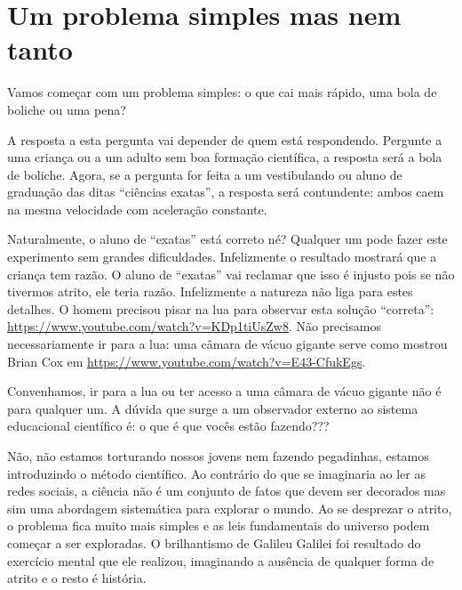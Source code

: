 \documentclass[article,12pt,oneside,a4paper,english,brazil,sumario=tradicional]{abntex2}
\date{2022}
\newcommand{\relatnum}{XYZ ABC-DEF}
\begin{document}

\imprimirfolhaderosto


\section{Um problema simples mas nem tanto}
\label{sec:intro}

Vamos começar com um problema simples: o que cai mais rápido, uma bola de boliche ou uma pena?

A resposta a esta pergunta vai depender de quem está respondendo. Pergunte a uma criança ou a um adulto sem boa formação científica, a resposta será a bola de boliche. Agora, se a pergunta for feita a um vestibulando ou aluno de graduação das ditas ``ciências exatas'', a resposta será contundente: ambos caem na mesma velocidade com aceleração constante.

Naturalmente, o aluno de ``exatas'' está correto né? Qualquer um pode fazer este experimento sem grandes dificuldades. Infelizmente o resultado mostrará que a criança tem razão. O aluno de ``exatas'' vai reclamar que isso é injusto pois se não tivermos atrito, ele teria razão. Infelizmente a natureza não liga para estes detalhes. O homem precisou pisar na lua para observar esta solução ``correta'': \url{https://www.youtube.com/watch?v=KDp1tiUsZw8}. Não precisamos necessariamente ir para a lua: uma câmara de vácuo gigante serve como mostrou Brian Cox em \url{https://www.youtube.com/watch?v=E43-CfukEgs}.

Convenhamos, ir para a lua ou ter acesso a uma câmara de vácuo gigante não é para qualquer um. A dúvida que surge a um observador externo ao sistema educacional científico é: o que é que vocês estão fazendo???

Não, não estamos torturando nossos jovens nem fazendo pegadinhas, estamos introduzindo o método científico. Ao contrário do que se imaginaria ao ler as redes sociais, a ciência não é um conjunto de fatos que devem ser decorados mas sim uma abordagem sistemática para explorar o mundo. Ao se desprezar o atrito, o problema fica muito mais simples e as leis fundamentais do universo podem começar a ser exploradas. O brilhantismo de Galileu Galilei foi resultado do exercício mental que ele realizou, imaginando a ausência de qualquer forma de atrito e o resto é história.
\end{document}
